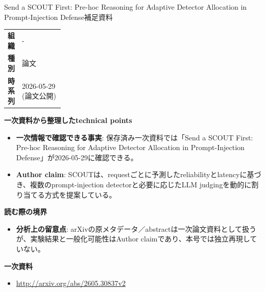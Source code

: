 \begin{technicalnote}{Send a SCOUT First: Pre-hoc Reasoning for Adaptive Detector Allocation in Prompt-Injection Defense}{補足資料}
\begingroup
\begin{tabularx}{\linewidth}{@{}>{\bfseries}p{0.22\linewidth}X@{}}
組織 & - \\
種別 & 論文 \\
時系列 & 2026-05-29 (論文公開) \\
\end{tabularx}
\smallskip
{\bfseries 一次資料から整理したtechnical points}
\begin{itemize}[leftmargin=1.5em,itemsep=0.35em]
\item \textbf{一次情報で確認できる事実}: 保存済み一次資料では「Send a SCOUT First: Pre-hoc Reasoning for Adaptive Detector Allocation in Prompt-Injection Defense」が2026-05-29に確認できる。
\end{itemize}
\begin{minipage}{\linewidth}
\begin{itemize}[leftmargin=1.5em,itemsep=0.35em]
\item \textbf{Author claim}: SCOUTは、requestごとに予測したreliabilityとlatencyに基づき、複数のprompt-injection detectorと必要に応じたLLM judgingを動的に割り当てる方式を提案している。
\end{itemize}
{\bfseries 読む際の境界}
\begin{itemize}[leftmargin=1.5em,itemsep=0.35em]
\item \textbf{分析上の留意点}: arXivの原メタデータ／abstractは一次論文資料として扱うが、実験結果と一般化可能性はAuthor claimであり、本号では独立再現していない。
\end{itemize}
\begin{samepage}
{\bfseries 一次資料}
\begingroup\sloppy
\begin{itemize}[leftmargin=1.5em,itemsep=0.25em]
\item {\scriptsize\url{http://arxiv.org/abs/2605.30837v2}}
\end{itemize}
\endgroup
\end{samepage}
\end{minipage}
\endgroup
\end{technicalnote}
\medskip
